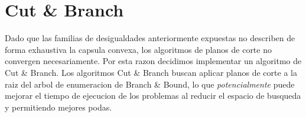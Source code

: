 \section{Cut \& Branch}

Dado que las familias de desigualdades anteriormente expuestas no describen de forma exhaustiva la capsula convexa, los algoritmos de planos de corte no convergen necesariamente. Por esta razon decidimos implementar un algoritmo de Cut \& Branch. Los algoritmos Cut \& Branch buscan aplicar planos de corte a la raiz del arbol de enumeracion de Branch \& Bound, lo que \textit{potencialmente} puede mejorar el tiempo de ejecucion de los problemas al reducir el espacio de busqueda y permitiendo mejores podas.

